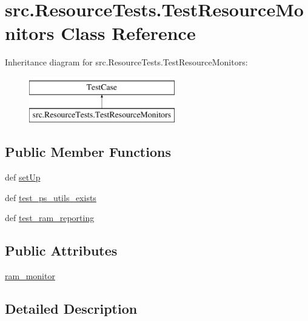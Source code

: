 \hypertarget{classsrc_1_1_resource_tests_1_1_test_resource_monitors}{\section{src.\-Resource\-Tests.\-Test\-Resource\-Monitors Class Reference}
\label{classsrc_1_1_resource_tests_1_1_test_resource_monitors}
}
Inheritance diagram for src.\-Resource\-Tests.\-Test\-Resource\-Monitors\-:\begin{figure}[H]
\begin{center}
\leavevmode
\includegraphics[height=2.000000cm]{classsrc_1_1_resource_tests_1_1_test_resource_monitors}
\end{center}
\end{figure}
\subsection*{Public Member Functions}
\begin{DoxyCompactItemize}
\item 
def \hyperlink{classsrc_1_1_resource_tests_1_1_test_resource_monitors_a4e95049904db56847ce86ffccc1c7cd5}{set\-Up}
\item 
def \hyperlink{classsrc_1_1_resource_tests_1_1_test_resource_monitors_adf9dcda768d239b0e4d9ff8c5f55f85e}{test\-\_\-ps\-\_\-utils\-\_\-exists}
\item 
def \hyperlink{classsrc_1_1_resource_tests_1_1_test_resource_monitors_a10b64b28ee480269e98acfdc433be1bf}{test\-\_\-ram\-\_\-reporting}
\end{DoxyCompactItemize}
\subsection*{Public Attributes}
\begin{DoxyCompactItemize}
\item 
\hyperlink{classsrc_1_1_resource_tests_1_1_test_resource_monitors_a5e2b2c45387dfbc53d3ac989032222d4}{ram\-\_\-monitor}
\end{DoxyCompactItemize}


\subsection{Detailed Description}


